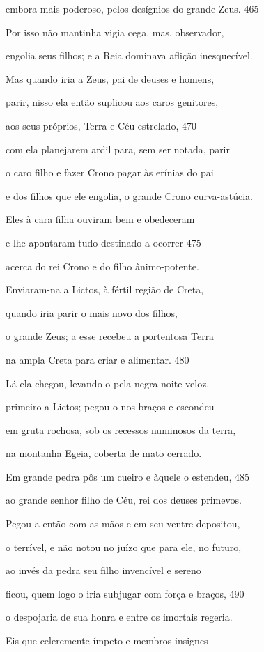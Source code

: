 embora mais poderoso, pelos desígnios do grande Zeus. \num{465}

Por isso não mantinha vigia cega, mas, observador,

engolia seus filhos; e a Reia dominava aflição inesquecível.

Mas quando iria a Zeus, pai de deuses e homens,

parir, nisso ela então suplicou aos caros genitores,

aos seus próprios, Terra e Céu estrelado, \num{470}

com ela planejarem ardil para, sem ser notada, parir

o caro filho e fazer Crono pagar às erínias do pai

e dos filhos que ele engolia, o grande Crono curva-astúcia.

Eles à cara filha ouviram bem e obedeceram

e lhe apontaram tudo destinado a ocorrer \num{475}

acerca do rei Crono e do filho ânimo-potente.

Enviaram-na a Lictos, à fértil região de Creta,

quando iria parir o mais novo dos filhos,

o grande Zeus; a esse recebeu a portentosa Terra

na ampla Creta para criar e alimentar. \num{480}

Lá ela chegou, levando-o pela negra noite veloz,

primeiro a Lictos; pegou-o nos braços e escondeu

em gruta rochosa, sob os recessos numinosos da terra,

na montanha Egeia, coberta de mato cerrado.

Em grande pedra pôs um cueiro e àquele o estendeu, \num{485}

ao grande senhor filho de Céu, rei dos deuses primevos.

Pegou-a então com as mãos e em seu ventre depositou,

o terrível, e não notou no juízo que para ele, no futuro,

ao invés da pedra seu filho invencível e sereno

ficou, quem logo o iria subjugar com força e braços, \num{490}

o despojaria de sua honra e entre os imortais regeria.

\quad{}Eis que celeremente ímpeto e membros insignes

